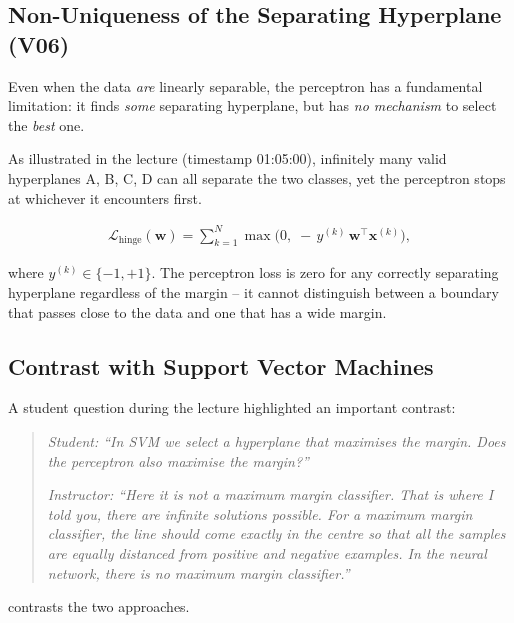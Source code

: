 \documentclass[12pt,a4paper]{article}
\begin{document}
\subsection{Non-Uniqueness of the Separating Hyperplane (V06)}
\label{subsec:non-unique}

Even when the data \emph{are} linearly separable, the perceptron has a
fundamental limitation: it finds \emph{some} separating hyperplane, but
has \emph{no mechanism} to select the \emph{best} one.

As illustrated in the lecture (timestamp 01:05:00), infinitely many valid
hyperplanes A, B, C, D can all separate the two classes, yet the
perceptron stops at whichever it encounters first.

\begin{align}
  \label{eq:loss-hinge}
  \mathcal{L}_{\text{hinge}}(\mathbf{w}) =
  \sum_{k=1}^{N} \max\!\bigl(0,\; -\,y^{(k)}\,\mathbf{w}^{\top}\mathbf{x}^{(k)}\bigr),
\end{align}

where $y^{(k)} \in \{-1, +1\}$.  The perceptron loss is zero for any
correctly separating hyperplane regardless of the margin -- it cannot
distinguish between a boundary that passes close to the data and one that
has a wide margin.

\subsection{Contrast with Support Vector Machines}
\label{subsec:svm-comparison}

A student question during the lecture highlighted an important contrast:

\begin{quote}
\textit{Student: ``In SVM we select a hyperplane that maximises the
margin.  Does the perceptron also maximise the margin?''}

\textit{Instructor: ``Here it is not a maximum margin classifier.
That is where I told you, there are infinite solutions possible.  For a
maximum margin classifier, the line should come exactly in the centre so
that all the samples are equally distanced from positive and negative
examples.  In the neural network, there is no maximum margin classifier.''}
\end{quote}

 contrasts the two approaches.
\end{document}
